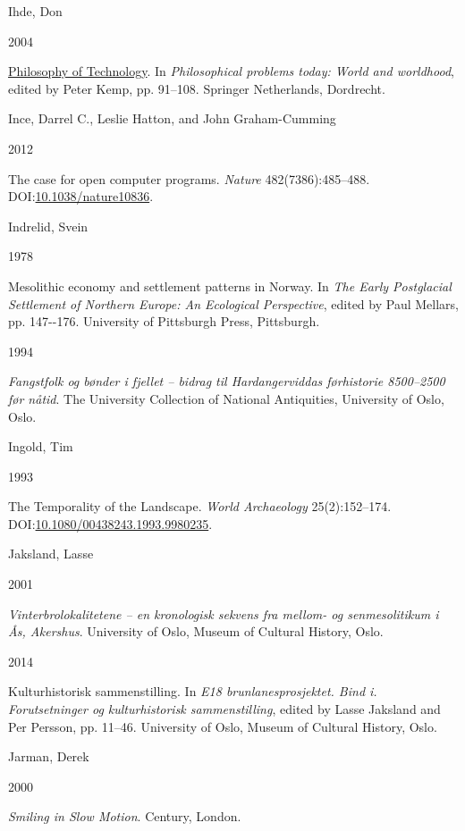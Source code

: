 \documentclass[
  12pt,
  a4paper,
  oneside]{book}
\newlength{\cslhangindent}
\newlength{\csllabelwidth}
\newlength{\cslentryspacingunit} %
\newenvironment{CSLReferences}[2] %
 {%
  \setlength{\parindent}{0pt}
  \ifodd #1
  \let\oldpar\par
  \def\par{\hangindent=\cslhangindent\oldpar}
  \fi
  \setlength{\parskip}{#2\cslentryspacingunit}
 }%
 {}
\newcommand{\CSLBlock}[1]{#1\hfill\break}
\newcommand{\CSLLeftMargin}[1]{\parbox[t]{\csllabelwidth}{#1}}
\newcommand{\CSLRightInline}[1]{\parbox[t]{\linewidth - \csllabelwidth}{#1}\break}
\begin{document}
\begin{CSLReferences}{0}{0}
\leavevmode{}%
\CSLBlock{Ihde, Don}
\CSLLeftMargin{ 2004}
\CSLRightInline{\href{https://doi.org/10.1007/1-4020-3027-4_3}{{Philosophy of Technology}}. In \emph{Philosophical problems today: World and worldhood}, edited by Peter Kemp, pp. 91--108. Springer Netherlands, Dordrecht.}

\leavevmode{}%
\CSLBlock{Ince, Darrel C., Leslie Hatton, and John Graham-Cumming}
\CSLLeftMargin{ 2012}
\CSLRightInline{{The case for open computer programs}. \emph{Nature} 482(7386):485--488. DOI:\href{https://doi.org/10.1038/nature10836}{10.1038/nature10836}.}

\leavevmode{}%
\CSLBlock{Indrelid, Svein}
\CSLLeftMargin{ 1978}
\CSLRightInline{{Mesolithic economy and settlement patterns in Norway}. In \emph{{The Early Postglacial Settlement of Northern Europe: An Ecological Perspective}}, edited by Paul Mellars, pp. 147-\/-176. University of Pittsburgh Press, Pittsburgh.}

\leavevmode{}%
\CSLLeftMargin{ 1994 }
\CSLRightInline{\emph{{Fangstfolk og bønder i fjellet -- bidrag til Hardangerviddas førhistorie 8500--2500 før nåtid}}. The University Collection of National Antiquities, University of Oslo, Oslo.}

\leavevmode{}%
\CSLBlock{Ingold, Tim}
\CSLLeftMargin{ 1993}
\CSLRightInline{{The Temporality of the Landscape}. \emph{World Archaeology} 25(2):152--174. DOI:\href{https://doi.org/10.1080/00438243.1993.9980235}{10.1080/00438243.1993.9980235}.}

\leavevmode{}%
\CSLBlock{Jaksland, Lasse}
\CSLLeftMargin{ 2001}
\CSLRightInline{\emph{{Vinterbrolokalitetene -- en kronologisk sekvens fra mellom- og senmesolitikum i Ås, Akershus}}. University of Oslo, Museum of Cultural History, Oslo.}

\leavevmode{}%
\CSLLeftMargin{ 2014 }
\CSLRightInline{Kulturhistorisk sammenstilling. In \emph{E18 brunlanesprosjektet. Bind i. Forutsetninger og kulturhistorisk sammenstilling}, edited by Lasse Jaksland and Per Persson, pp. 11--46. University of Oslo, Museum of Cultural History, Oslo.}

\leavevmode{}%
\CSLBlock{Jarman, Derek}
\CSLLeftMargin{ 2000}
\CSLRightInline{\emph{{Smiling in Slow Motion}}. Century, London.}


\end{CSLReferences}
\end{document}
